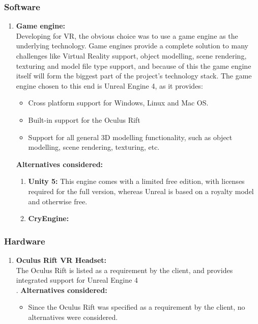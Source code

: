 \documentclass[a4paper,12pt]{article}
\begin{document}
\subsubsection{Software}
\begin{enumerate}
	\item \textbf{Game engine:}\\
		Developing for VR, the obvious choice was to use a game engine as the underlying technology. Game engines provide a complete solution to many challenges like Virtual Reality support, object modelling, scene rendering, texturing and model file type support, and because of this the game engine itself will form the biggest part of the project's technology stack. The game engine chosen to this end is Unreal Engine 4, as it provides:
		\begin{itemize}
			\item Cross platform support for Windows, Linux and Mac OS.
			\item Built-in support for the Oculus Rift
			\item Support for all general 3D modelling functionality, such as object modelling, scene rendering, texturing, etc.
		\end{itemize}
		\textbf{Alternatives considered:}
		\begin{enumerate}
			\item \textbf{Unity 5:}  This engine comes with a limited free edition, with licenses required for the full version, whereas Unreal is based on a royalty model and otherwise free.%
			\item \textbf{CryEngine:} %
		\end{enumerate}
\end{enumerate}
\subsubsection{Hardware}
\begin{enumerate}
	\item \textbf{Oculus Rift VR Headset:}\\
		The Oculus Rift is listed as a requirement by the client, and provides integrated support for Unreal Engine 4\\.
		\textbf{Alternatives considered:}
		\begin{itemize}
			\item Since the Oculus Rift was specified as a requirement by the client, no alternatives were considered.
		\end{itemize}
\end{enumerate}
\newpage
%
%
\end{document}
